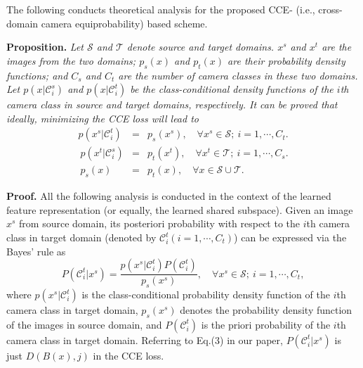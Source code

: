\documentclass[10pt,twocolumn,letterpaper]{article}
\begin{document}
The following conducts theoretical analysis for the proposed CCE- (i.e., cross-domain camera equiprobability) based scheme. 



\textbf{Proposition.} \textit{Let ${\mathcal S}$ and ${\mathcal T}$ denote source and target domains. $x^s$ and $x^t$ are the images from the two domains; $p_s(x)$ and $p_t(x)$ are their probability density functions; and $C_s$ and $C_t$ are the number of camera classes in these two domains. Let $p(x|\mathcal{C}^s_i)$ and $p(x|\mathcal{C}^t_i)$ be the class-conditional density functions of the $i$th camera class in source and target domains, respectively. It can be proved that ideally, minimizing the CCE loss will lead to}
\begin{eqnarray}\label{eqn:proposition} 
p(x^s|\mathcal{C}^t_i) &=& p_s(x^s),\quad \forall x^s \in {\mathcal S};~i=1,\cdots,C_t.\\~\nonumber
p(x^t|\mathcal{C}^s_i) &=& p_t(x^t),\quad \forall x^t \in {\mathcal T};~i=1,\cdots,C_s.\\~\nonumber
p_s(x) &=& p_t(x), \quad \forall x \in {\mathcal S}\cup{\mathcal T}.
\end{eqnarray}

\textbf{Proof.} All the following analysis is conducted in the context of the learned feature representation (or equally, the learned shared subspace). Given an image $x^s$ from source domain, its posteriori probability with respect to the $i$th camera class in target domain (denoted by $\mathcal{C}^t_i (i=1,\cdots,C_t)$) can be expressed via the Bayes' rule as 
\begin{equation}\label{eqn:Bayes}
P(\mathcal{C}^t_i|x^s) = \frac{p(x^s|\mathcal{C}^t_i)P(\mathcal{C}^t_i)}{p_s(x^s)},\quad \forall x^s \in {\mathcal S};~i=1,\cdots,C_t, 
\end{equation}where $p(x^s|\mathcal{C}^t_i)$ is the class-conditional probability density function of the $i$th camera class in target domain, $p_s(x^s)$ denotes the probability density function of the images in source domain, and $P(\mathcal{C}^t_i)$ is the priori probability of the $i$th camera class in target domain. Referring to Eq.(3) in our paper, $P(\mathcal{C}^t_i|x^s)$ is just $D(B(x),j)$ in the CCE loss. 
\end{document}
